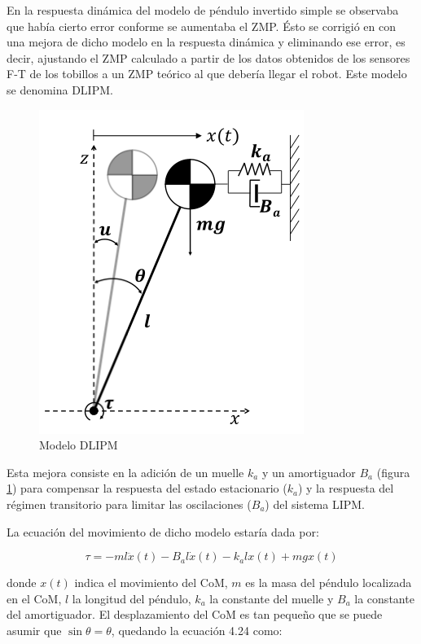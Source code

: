 En la respuesta dinámica del modelo de péndulo invertido simple se observaba que había cierto error conforme se aumentaba el ZMP. Ésto se corrigió en \cite{ref21} con una mejora de dicho modelo en la respuesta dinámica y eliminando ese error, es decir, ajustando el ZMP calculado a partir de los datos obtenidos de los sensores F-T de los tobillos a un ZMP teórico al que debería llegar el robot. Este modelo se denomina DLIPM.

\begin{figure}[H]
\centering
\includegraphics[scale=0.6]{imagenes/apartado_4/45_modelo_dlipm}
\caption{Modelo DLIPM}
\label{figura45}
\end{figure}

Esta mejora consiste en la adición de un muelle $k_a$ y un amortiguador $B_a$ (figura \ref{figura45}) para compensar la respuesta del estado estacionario ($k_a$) y la respuesta del régimen transitorio para limitar las oscilaciones ($B_a$) del sistema LIPM.

La ecuación del movimiento de dicho modelo estaría dada por:

\begin{equation}
\tau = -ml\ddot{x}(t) - B_a l\dot{x}(t) - k_a lx(t) + mgx(t)
\label{ec424}
\end{equation}

donde $x(t)$ indica el movimiento del CoM, $m$ es la masa del péndulo localizada en el CoM, $l$ la longitud del péndulo, $k_a$ la constante del muelle y $B_a$ la constante del amortiguador. El desplazamiento del CoM es tan pequeño que se puede asumir que $\sin\theta = \theta$, quedando la ecuación 4.24 como:

